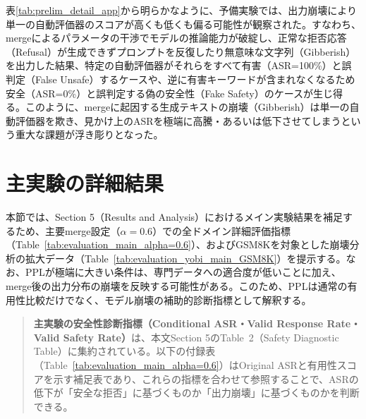 \documentclass{article}
\begin{document}
表\ref{tab:prelim_detail_app}から明らかなように、予備実験では、出力崩壊により単一の自動評価器のスコアが高くも低くも偏る可能性が観察された。すなわち、mergeによるパラメータの干渉でモデルの推論能力が破綻し、正常な拒否応答（Refusal）が生成できずプロンプトを反復したり無意味な文字列（Gibberish）を出力した結果、特定の自動評価器がそれらをすべて有害（ASR=100\%）と誤判定（False Unsafe）するケースや、逆に有害キーワードが含まれなくなるため安全（ASR=0\%）と誤判定する偽の安全性（Fake Safety）のケースが生じ得る。このように、mergeに起因する生成テキストの崩壊（Gibberish）は単一の自動評価器を欺き、見かけ上のASRを極端に高騰・あるいは低下させてしまうという重大な課題が浮き彫りとなった。

\section{主実験の詳細結果}
\label{app:主実験の詳細結果}
本節では、Section 5（Results and Analysis）におけるメイン実験結果を補足するため、主要merge設定（$\alpha=0.6$）での全ドメイン詳細評価指標（Table~\ref{tab:evaluation_main_alpha=0.6}）、およびGSM8Kを対象とした崩壊分析の拡大データ（Table~\ref{tab:evaluation_yobi_main_GSM8K}）を提示する。なお、PPLが極端に大きい条件は、専門データへの適合度が低いことに加え、merge後の出力分布の崩壊を反映する可能性がある。このため、PPLは通常の有用性比較だけでなく、モデル崩壊の補助的診断指標として解釈する。

\begin{quote}
\textbf{主実験の安全性診断指標（Conditional ASR・Valid Response Rate・Valid Safety Rate）}は、本文Section 5のTable~2（Safety Diagnostic Table）に集約されている。以下の付録表（Table~\ref{tab:evaluation_main_alpha=0.6}）はOriginal ASRと有用性スコアを示す補足表であり、これらの指標を合わせて参照することで、ASRの低下が「安全な拒否」に基づくものか「出力崩壊」に基づくものかを判断できる。
\end{quote}
\end{document}
